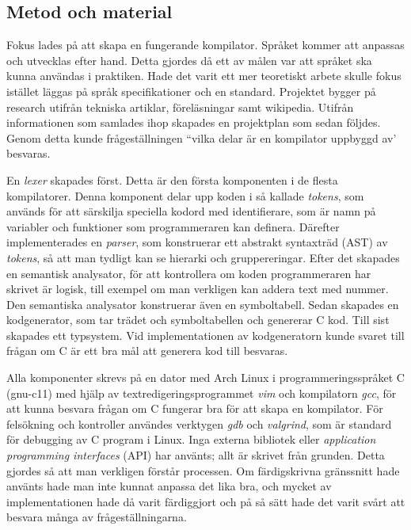 \documentclass{theme}
\begin{document}
\subsection{Metod och material}

Fokus lades på att skapa en fungerande kompilator. Språket kommer att anpassas
och utvecklas efter hand. Detta gjordes då ett av målen var att språket ska
kunna användas i praktiken. Hade det varit ett mer teoretiskt arbete skulle
fokus istället läggas på språk
specifikationer och en standard. Projektet bygger
på research utifrån tekniska artiklar, föreläsningar samt wikipedia. Utifrån
informationen som samlades ihop skapades en projektplan som sedan följdes. Genom
detta kunde frågeställningen ``vilka delar är en kompilator uppbyggd av'
besvaras.

En \textit{lexer} skapades först. Detta är den första komponenten i de
flesta kompilatorer. Denna komponent delar upp koden i så kallade
\textit{tokens}, som används för att särskilja speciella kodord med
identifierare, som är namn på
variabler och funktioner som programmeraren kan definera. Därefter
implementerades en \textit{parser}, som konstruerar ett abstrakt syntaxträd
(AST) av \textit{tokens}, så att man tydligt
kan se hierarki och gruppereringar. Efter det skapades en semantisk analysator,
för att kontrollera om koden programmeraren har skrivet är logisk, till exempel
om man verkligen kan addera text med nummer. Den semantiska analysator
konstruerar även en symboltabell. Sedan skapades en kodgenerator, som tar trädet
och symboltabellen
och genererar C kod. Till sist skapades ett typsystem. Vid implementationen av
kodgeneratorn kunde svaret till frågan om C är ett bra mål att generera kod till
besvaras.

Alla komponenter skrevs på en dator med Arch Linux i programmeringsspråket C
(gnu-c11) med hjälp av textredigeringsprogrammet \textit{vim} och kompilatorn
\textit{gcc}, för att kunna besvara frågan om C fungerar bra för att skapa en
kompilator. För felsökning och kontroller användes verktygen \textit{gdb} och
\textit{valgrind}, som är standard för debugging av C program i Linux. Inga
externa bibliotek eller \textit{application programming interfaces} (API) har
använts; allt är skrivet från grunden. Detta
gjordes så att man verkligen förstår processen. Om färdigskrivna gränssnitt hade
använts hade man inte kunnat anpassa det lika bra, och mycket av
implementationen hade då varit färdiggjort och på så sätt hade det varit svårt
att besvara många av frågeställningarna.
\end{document}
